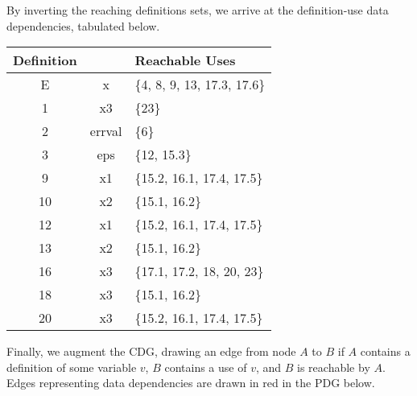\documentclass{article}
\newcommand\s[1]{\{#1\}}
\newcommand\varfamily{\ttfamily}  %
\begin{document}
\begin{enumerate}
    By inverting the reaching definitions sets, we arrive at the
    definition-use data dependencies, tabulated below.
    \begin{center}
      \begin{tabular}{c>{\varfamily}cl}
        \toprule
        Definition
        & \multicolumn{1}{c}{Variable}
        & Reachable Uses
        \\
        \midrule
        E  & x      & \s{4, 8, 9, 13, 17.3, 17.6} \\
        1  & x3     & \s{23} \\
        2  & errval & \s{6} \\
        3  & eps    & \s{12, 15.3} \\
        9  & x1     & \s{15.2, 16.1, 17.4, 17.5} \\
        10 & x2     & \s{15.1, 16.2} \\
        12 & x1     & \s{15.2, 16.1, 17.4, 17.5} \\
        13 & x2     & \s{15.1, 16.2} \\
        16 & x3     & \s{17.1, 17.2, 18, 20, 23} \\
        18 & x3     & \s{15.1, 16.2} \\
        20 & x3     & \s{15.2, 16.1, 17.4, 17.5} \\
        \bottomrule
      \end{tabular}
    \end{center}

    Finally, we augment the CDG, drawing an edge from node $A$ to $B$
    if $A$ contains a definition of some variable $v$, $B$ contains a
    use of $v$, and $B$ is reachable by $A$. Edges representing data
    dependencies are drawn in red in the PDG below.

    \begin{center}
      \begin{minipage}[b]{.8\linewidth}
        \begin{center}
          \CDG
\end{center}
\end{minipage}
\end{center}
\end{enumerate}
\end{document}
